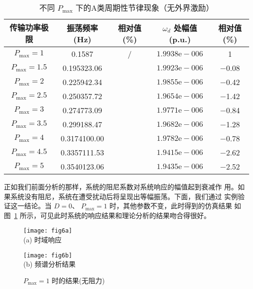 \documentclass[withoutpreface,bwprint]{cumcmthesis} %
\begin{document}
\begin{table}[h!t]
\center
\caption{不同 $P_{\max}$ 下的A类周期性节律现象（无外界激励）}
\renewcommand\arraystretch{0.9}
\begin{tabular}{c|c|c|c|c}
\hline
传输功率极限  & 振荡频率 (Hz) & 相对值 (\%) & $\omega_{d}$ 处幅值 (p.u.) &  相对值 (\%) \\
    \hline
    $P_{\max}=1$ & 0.1587 & / & $1.9938 \mathrm{e}-006$ & 1 \\
    \hline
    $P_{\max}=1.5$ & 0.195323.06 & & $1.9923 \mathrm{e}-006$ & $-$0.08 \\
    \hline
    $P_{\max}=2$ & 0.225942.34 &  &$1.9855 \mathrm{e}-006$ & $-$0.42 \\
    \hline
   $ P_{\max}=2.5$ & 0.250357.72 & & $1.9654 \mathrm{e}-006$ & $-$1.42 \\
    \hline
    $P_{\max}=3$ & 0.274773.09 & & $1.9771 \mathrm{e}-006$ & $-$0.84 \\
    \hline
    $P_{\max}=3.5$ & 0.299188.47 & & $1.9682 \mathrm{e}-006$ & $-$1.28 \\
    \hline
    $P_{\max}=4 $ & 0.3174100.00 & & $1.9782 \mathrm{e}-006$ & $-$0.78 \\
    \hline
    $P_{\max}=4.5$ & 0.3357111.53 & & $1.9415 \mathrm{e}-006$ & $-$2.62 \\
    \hline
    $P_{\max}=5$ & 0.3540123.06 & & $1.9435 \mathrm{e}-006$ & $-$2.52 \\
    \hline
\end{tabular}
 \label{tab1}
\end{table}

正如我们前面分析的那样，系统的阻尼系数对系统响应的幅值起到衰减作
用。如果系统没有阻尼，系统在遭受扰动后将呈现出等幅振荡。下面，我们通过
实例验证这一结论。当 $D = 0$、
$P_{\max} =1$ 时，其他参数不变，此时得到的仿真结果
如图~\ref{fig6} 所示，可见此时系统的响应结果和理论分析的结果吻合得很好。

\begin{figure}[h!t]
\begin{minipage}{0.48\linewidth}
  \centering
  {
  \texttt{[image: fig6a]}\\
  (a) 时域响应
  }
\end{minipage}\hfill
\begin{minipage}{0.48\linewidth}
  \centering
  {
  \texttt{[image: fig6b]}\\
  (b) 频谱分析结果
  }
\end{minipage}
    \caption{$P_{\max}=1$ 时的结果(无阻力)}
    \label{fig6}
    \end{figure}
\end{document}
